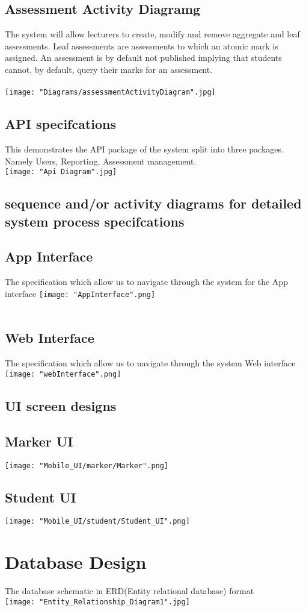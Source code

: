 \documentclass[10pt,a4paper]{article}
\begin{document}
\pagebreak
\subsection*{Assessment Activity Diagramg}
The system will allow lecturers to create, modify and remove aggregate and leaf assessments. 
Leaf assessments are assessments to which an atomic mark is assigned. An
assessment is by default not published implying that students cannot, by default, query their marks
for an assessment.\\\\
\texttt{[image: "Diagrams/assessmentActivityDiagram".jpg]}\\

\pagebreak
\subsection{API specifcations}
This demonstrates the API package of the system split into three packages. Namely Users, Reporting, Assessment management.\\
\texttt{[image: "Api Diagram".jpg]}

\subsection{sequence and/or activity diagrams for detailed system process specifcations}

\subsection*{App Interface}
The specification which allow us to navigate through the system for the App interface
\texttt{[image: "AppInterface".png]}\\\\

\subsection*{Web Interface}
The specification which allow us to navigate through the system Web interface
\texttt{[image: "webInterface".png]}\\

\subsection{UI screen designs}
\subsection*{Marker UI}
\texttt{[image: "Mobile\_UI/marker/Marker".png]}
\subsection*{Student UI}
\texttt{[image: "Mobile\_UI/student/Student\_UI".png]}

\section{Database Design}
The database schematic in ERD(Entity relational database) format\\
\texttt{[image: "Entity\_Relationship\_Diagram1".jpg]}
\end{document}
